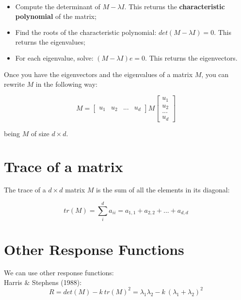 \documentclass{article}
\begin{document}
\begin{itemize}
    \item Compute the determinant of $M - \lambda I$. This returns the \textbf{characteristic polynomial} of the matrix;
    \item Find the roots of the characteristic polynomial: $det(M - \lambda I) = 0$. This returns the eigenvalues;
    \item For each eigenvalue, solve: $(M - \lambda I)e=0$. This returns the eigenvectors.
\end{itemize}

Once you have the eigenvectors and the eigenvalues of a matrix $M$, you can rewrite $M$ in the following way:

\begin{equation*}
    M = \begin{bmatrix} 
        u_1 & u_2 & ... & u_d 
    \end{bmatrix} 
    M 
    \begin{bmatrix} 
        u_1 \\ u_2 \\ ... \\ u_d 
    \end{bmatrix} 
\end{equation*}

being $M$ of size $d \times d$.

\section*{Trace of a matrix}

The trace of a $d\times d$ matrix $M$ is the sum of all the elements in its diagonal:

\begin{equation*}
    tr(M) = \sum_{i}^{d} a_{ii} = a_{1,1} + a_{2,2} + ... + a_{d,d}
\end{equation*}

\newpage

\section*{Other Response Functions}

We can use other response functions: \\

Harris $\&$ Stephens (1988):
\begin{equation*}
    R = det(M) - k\ tr(M)^2 = \lambda_1 \lambda_2 - k\ (\lambda_1 + \lambda_2)^2
\end{equation*}
\end{document}
